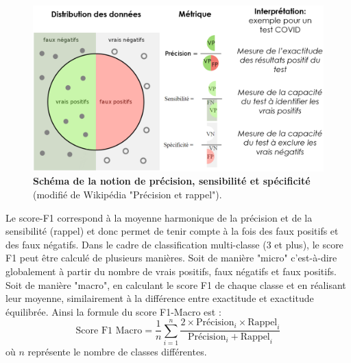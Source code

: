 \begin{figure}[!ht]
 \centering
 \includegraphics[width=1\textwidth]{figures/prec_recall.png}
 \caption[Précision, sensibilité et spécificité]{\textbf{Schéma de la notion de précision, sensibilité et spécificité} (modifié de Wikipédia "Précision et rappel").}
 \label{fig:prec_recall_spec}
\end{figure}

Le score-F1 correspond à la moyenne harmonique de la précision et de la sensibilité (rappel) et donc permet de tenir compte à la fois des faux positifs et des faux négatifs. Dans le cadre de classification multi-classe (3 et plus), le score F1 peut être calculé de plusieurs manières. Soit de manière "micro" c'est-à-dire globalement à partir du nombre de vrais positifs, faux négatifs et faux positifs. Soit de manière "macro", en calculant le score F1 de chaque classe et en réalisant leur moyenne, similairement à la différence entre exactitude et exactitude équilibrée. Ainsi la formule du score F1-Macro est :
\[ \text{Score F1 Macro} = \frac{1}{n} \sum_{i=1}^{n} \frac{2 \times \text{Précision}_i \times \text{Rappel}_i}{\text{Précision}_i + \text{Rappel}_i} \] où \(n\) représente le nombre de classes différentes.

